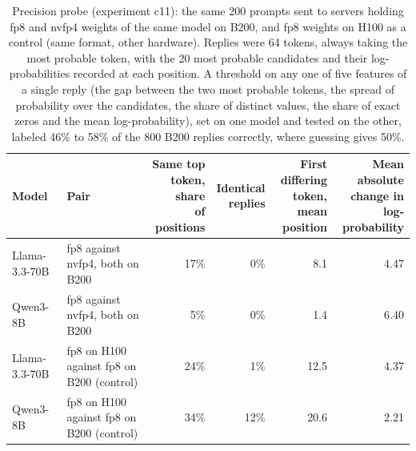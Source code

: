 \begin{table}[t]
\centering
\scriptsize
\setlength{\tabcolsep}{3pt}
\caption{Precision probe (experiment c11): the same 200 prompts sent to servers holding fp8 and nvfp4 weights of the same model on B200, and fp8 weights on H100 as a control (same format, other hardware). Replies were 64 tokens, always taking the most probable token, with the 20 most probable candidates and their log-probabilities recorded at each position. A threshold on any one of five features of a single reply (the gap between the two most probable tokens, the spread of probability over the candidates, the share of distinct values, the share of exact zeros and the mean log-probability), set on one model and tested on the other, labeled 46\% to 58\% of the 800 B200 replies correctly, where guessing gives 50\%.}\label{tab:precision_probe}
\begin{tabular}{llrrrr}
\toprule
Model & Pair & \makecell[r]{Same top\\token, share\\of positions} & \makecell[r]{Identical\\replies} & \makecell[r]{First\\differing\\token, mean\\position} & \makecell[r]{Mean\\absolute\\change in\\log-probability} \\
\midrule
Llama-3.3-70B & fp8 against nvfp4, both on B200 & 17\% & 0\% & 8.1 & 4.47 \\
Qwen3-8B & fp8 against nvfp4, both on B200 & 5\% & 0\% & 1.4 & 6.40 \\
Llama-3.3-70B & fp8 on H100 against fp8 on B200 (control) & 24\% & 1\% & 12.5 & 4.37 \\
Qwen3-8B & fp8 on H100 against fp8 on B200 (control) & 34\% & 12\% & 20.6 & 2.21 \\
\bottomrule
\end{tabular}
\end{table}
